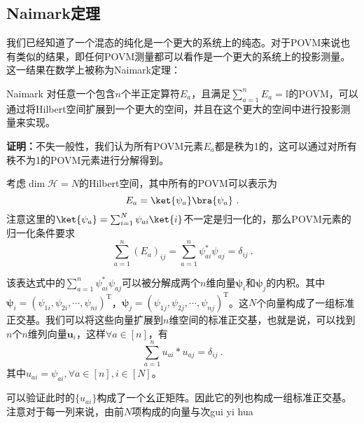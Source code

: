 \subsection{Naimark定理}
我们已经知道了一个混态的纯化是一个更大的系统上的纯态。对于POVM来说也有类似的结果，即任何POVM测量都可以看作是一个更大的系统上的投影测量。这一结果在数学上被称为Naimark定理：
\begin{theorem}{Naimark}
对任意一个包含$n$个半正定算符$E_a$，且满足$\sum_{a=1}^n E_a=\mathbb{I}$的POVM，可以通过将Hilbert空间扩展到一个更大的空间，并且在这个更大的空间中进行投影测量来实现。
\end{theorem}

\textbf{证明：}不失一般性，我们认为所有POVM元素$E_a$都是秩为1的，这可以通过对所有秩不为1的POVM元素进行分解得到。

考虑$\operatorname{dim}\mathcal{H}=N$的Hilbert空间，其中所有的POVM可以表示为
\begin{equation}
E_a=\ket{\psi_a}\bra{\psi_a}~.
\end{equation}
注意这里的$\ket{\psi_a}=\sum_{i=1}^N\psi_{ai}\ket{i}$不一定是归一化的，那么POVM元素的归一化条件要求
\begin{equation}
\sum_{a=1}^n\left(E_a\right)_{i j}=\sum_{a=1}^n \psi_{a i}^* \psi_{a j}=\delta_{i j}~.
\end{equation}

该表达式中的$\sum_{a=1}^n \psi_{a i}^* \psi_{a j}$可以被分解成两个$n$维向量$\boldsymbol{\psi}_i$和$\boldsymbol{\psi}_j$的内积。其中$\boldsymbol{\psi}_i=\left(\psi_{1 i}, \psi_{2 i}, \cdots, \psi_{n i}\right)^{\mathrm{T}}$，$\boldsymbol{\psi}_j=\left(\psi_{1 j}, \psi_{2 j}, \cdots, \psi_{n j}\right)^{\mathrm{T}}$。这$N$个向量构成了一组标准正交基。我们可以将这些向量扩展到$n$维空间的标准正交基，也就是说，可以找到$n$个$n$维列向量$\boldsymbol{u}_i$，这样$\forall a\in[n]$，有
\begin{equation}
\sum_{a=1}^n u_{a i}*u_{a j}=\delta_{ij}~.
\end{equation}
其中$u_{ai}=\psi_{ai},\forall a\in[n],i\in[N]$。

可以验证此时的$\{u_{ai}\}$构成了一个幺正矩阵。因此它的列也构成一组标准正交基。注意对于每一列来说，由前$N$项构成的向量与次gui yi hua

